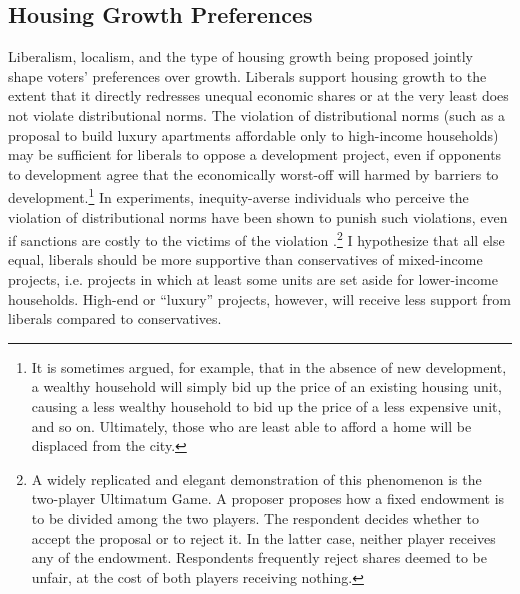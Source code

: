 \documentclass[article,12pt]{memoir}
\begin{document}
\subsection{Housing Growth Preferences} 
Liberalism, localism, and the type of housing growth being proposed jointly shape voters' preferences over growth. Liberals support housing growth to the extent that it directly redresses unequal economic shares or at the very least does not violate distributional norms. The violation of distributional norms (such as a proposal to build luxury apartments affordable only to high-income households) may be sufficient for liberals to oppose a development project, even if opponents to development agree that the economically worst-off will harmed by barriers to development.\footnote{It is sometimes argued, for example, that in the absence of new development, a wealthy household will simply bid up the price of an existing housing unit, causing a less wealthy household to bid up the price of a less expensive unit, and so on. Ultimately, those who are least able to afford a home will be displaced from the city.} In experiments, inequity-averse individuals who perceive the violation of distributional norms have been shown to punish such violations, even if sanctions are costly to the victims of the violation \citep{fehr_theory_1999,fehr_cooperation_2000,henrich_does_2000,fehr_third-party_2004}.\footnote{A widely replicated and elegant demonstration of this phenomenon is the two-player Ultimatum Game. A proposer proposes how a fixed endowment is to be divided among the two players. The respondent decides whether to accept the proposal or to reject it. In the latter case, neither player receives any of the endowment. Respondents frequently reject shares deemed to be unfair, at the cost of both players receiving nothing.} I hypothesize that all else equal, liberals should be more supportive than conservatives of mixed-income projects, i.e. projects in which at least some units are set aside for lower-income households. High-end or ``luxury'' projects, however, will receive less support from liberals compared to conservatives.
\end{document}
